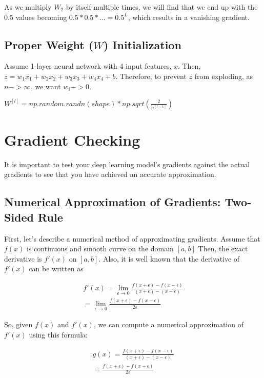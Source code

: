 \documentclass{article}
\begin{document}
As we multiply $W_2$ by itself multiple times, we will find that we end up with the $0.5$ values becoming $0.5 * 0.5 * ... = 0.5^L$, which results in a vanishing gradient.

\subsection{Proper Weight ($W$) Initialization}

Assume 1-layer neural network with 4 input features, $x$.  Then, $z = w_1 x_1 + w_2 x_2 + w_3 x_3 + w_4 x_4 + b$.  Therefore, to prevent $z$ from exploding, as $n -> \infty$, we want $w_i -> 0$.

$W^{[l]} = np.random.randn(shape) * np.sqrt(\frac{2}{n^{[l-1]}})$

\section{Gradient Checking}

It is important to test your deep learning model's gradients against the actual gradients to see that you have achieved an accurate approximation.

\subsection{Numerical Approximation of Gradients: Two-Sided Rule}

First, let's describe a numerical method of approximating gradients.  Assume that $f(x)$ is continuous and smooth curve on the domain $[a,b]$  Then, the exact derivative is $f'(x)$ on $[a,b]$.  Also, it is well known that the derivative of $f'(x)$ can be written as

\begin{align}
f'(x) = \lim_{\epsilon \to 0} \frac{f(x + \epsilon) - f(x - \epsilon)}{(x + \epsilon) - (x - \epsilon)} \\
= \lim_{\epsilon \to 0} \frac{f(x + \epsilon) - f(x - \epsilon)}{2 \epsilon}
\end{align}

So, given $f(x)$ and $f'(x)$, we can compute a numerical approximation of $f'(x)$ using this formula:

\begin{align}
g(x) = \frac{f(x + \epsilon) - f(x - \epsilon)}{(x + \epsilon) - (x - \epsilon)} \\
= \frac{f(x + \epsilon) - f(x - \epsilon)}{2 \epsilon}
\end{align}
\end{document}
